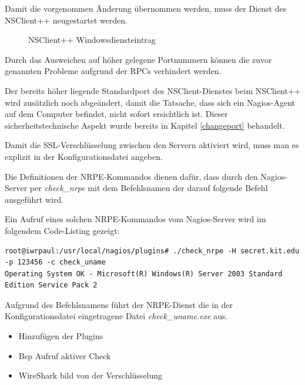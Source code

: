 Damit die vorgenommen Änderung übernommen werden, muss der Dienst des NSClient++ neugestartet werden. 

\begin{figure}[ht]
	\centering
		\caption{NSClient++ Windowsdiensteintrag}
		\label{nscs3}
\end{figure}

Durch das Ausweichen auf höher gelegene Portnummern können die zuvor genannten Probleme aufgrund der \gls{RPC}s verhindert werden.

Der bereits höher liegende Standardport des NSClient-Dienstes beim NSClient++ wird zusätzlich noch abgeändert, damit die Tatsache, dass sich ein Nagios-Agent auf dem Computer befindet, nicht sofort ersichtlich ist.
Dieser sicherheitstechnische Aspekt wurde bereits in Kapitel \ref{changeport} behandelt.

Damit die \gls{SSL}-Verschlüsselung zwischen den Servern aktiviert wird, muss man es explizit in der Konfigurationsdatei angeben.

Die Definitionen der \gls{NRPE}-Kommandos dienen dafür, dass durch den Nagios-Server per \textit{check\_nrpe} mit dem Befehlsnamen der darauf folgende Befehl ausgeführt wird.

Ein Aufruf eines solchen \gls{NRPE}-Kommandos vom Nagios-Server wird im folgendem Code-Listing gezeigt:

\begin{lstlisting}[captionpos=b, caption=Aufruf eines NRPE-Kommandos, label=nrpe-command-example, breaklines = true]
root@iwrpaul:/usr/local/nagios/plugins# ./check_nrpe -H secret.kit.edu -p 123456 -c check_uname
Operating System OK - Microsoft(R) Windows(R) Server 2003 Standard Edition Service Pack 2
\end{lstlisting}

Aufgrund des Befehlsnamens führt der \gls{NRPE}-Dienst die in der Konfigurationsdatei eingetragene Datei \textit{check\_uname.exe} aus.




\begin{itemize}
\item Hinzufügen der Plugins
\item Bsp Aufruf aktiver Check
\item WireShark bild von der Verschlüsselung
\end{itemize}

